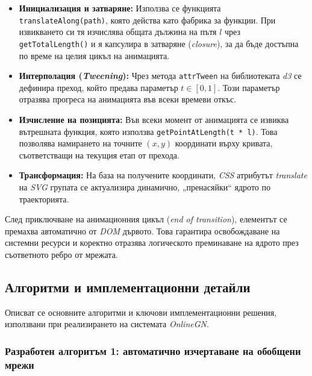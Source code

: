 \begin{itemize}
	\item \textbf{Инициализация и затваряне:} Използва се функцията \texttt{translateAlong(path)}, която действа като фабрика за функции. При извикването си тя изчислява общата дължина на пътя $l$ чрез \texttt{getTotalLength()} и я капсулира в затваряне (\textit{closure}), за да бъде достъпна по време на целия цикъл на анимацията.
	
	\item \textbf{Интерполация (\textit{Tweening}):} Чрез метода \texttt{attrTween} на библиотеката \textit{d3} се дефинира преход, който предава параметър $t \in [0, 1]$. Този параметър отразява прогреса на анимацията във всеки времеви откъс.

	\item \textbf{Изчисление на позицията:} Във всеки момент от анимацията се извиква вътрешната функция, която използва \texttt{getPointAtLength(t * l)}. Това позволява намирането на точните $(x, y)$ координати върху кривата, съответстващи на текущия етап от прехода.

	\item \textbf{Трансформация:} На база на получените координати, \textit{CSS} атрибутът \textit{translate} на \textit{SVG} групата се актуализира динамично, „пренасяйки“ ядрото по траекторията.
\end{itemize}

След приключване на анимационния цикъл (\textit{end of transition}), елементът се премахва автоматично от \textit{DOM} дървото. Това гарантира освобождаване на системни ресурси и коректно отразява логическото преминаване на ядрото през съответното ребро от мрежата.

\vspace{0.25cm}
\newpage

\subsection{Алгоритми и имплементационни детайли}
\hspace*{2.5em}Описват се основните алгоритми и ключови имплементационни решения, използвани при реализирането на системата \textit{OnlineGN}.

\subsubsection{Разработен алгоритъм 1: автоматично изчертаване на обобщени мрежи}

